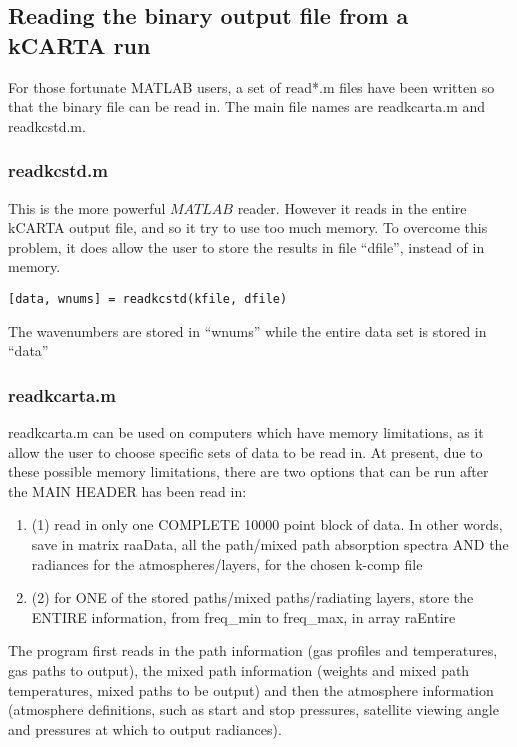 \documentclass[12pt]{article}
\newcommand{\kc}{\textsf{kCARTA}\xspace}
\begin{document}
{{{{\subsection{Reading the binary output file from a \kc run}

For those fortunate {\sf MATLAB} users, a set of read*.m files have
been written so that the binary file can be read in. The main file
names are readkcarta.m and readkcstd.m.

\subsubsection{readkcstd.m}
This is the more powerful $MATLAB$ reader. However it reads in the entire
\kc output file, and so it try to use too much memory. To overcome this 
problem, it does allow the user to store the results in file ``dfile'', 
instead of in memory.
\begin{verbatim}
[data, wnums] = readkcstd(kfile, dfile)
\end{verbatim}
The wavenumbers are stored in ``wnums'' while the entire data set is stored in
``data''

\subsubsection{readkcarta.m}
readkcarta.m can be used on computers which have memory limitations, as it 
allow the user to choose specific sets of data to be read in. At present, 
due to these possible memory limitations, there are two options that can be 
run after the MAIN HEADER has been read in:

\begin{enumerate}
\item 
    (1) read in only one COMPLETE 10000 point block of data.  In other
    words, save in matrix raaData, all the path/mixed path
    absorption spectra AND the radiances for the atmospheres/layers,
    for the chosen k-comp file
\item 
   (2) for ONE of the stored paths/mixed paths/radiating layers, store
   the ENTIRE information, from freq\_min to freq\_max, in array
   raEntire
\end{enumerate}

The program first reads in the path information (gas profiles and 
temperatures, gas paths to output), the mixed path information (weights and 
mixed path temperatures, mixed paths to be output) and then the atmosphere
information (atmosphere definitions, such as start and stop pressures, 
satellite viewing angle and pressures at which to output radiances).

}}}}
\end{document}
